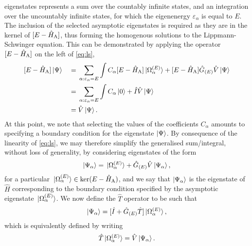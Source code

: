 \documentclass[]{article}
\begin{document}
eigenstates represents a sum over the countably infinite states, and an
integration over the uncountably infinite states, for which the eigenenergy
$\varepsilon_{\alpha}$ is equal to $E$.
The inclusion of the selected asymptotic eigenstates is required as they are in
the kernel of $[E - \hat{H}_{\rm{A}}]$, thus forming the homogenous
solutions to the Lippmann-Schwinger equation.
This can be demonstrated by applying the operator $[E - \hat{H}_{\rm{A}}]$
on the left of \eqref{eq:ls},
\begin{alignat*}{2}
  &
  [
    E
    -
    \hat{H}_{\rm{A}}
  ]
  \ket{\Psi}
  &
  {}={}
  &
  \sum_{\alpha : \varepsilon_{\alpha} = E}\int
  C_{\alpha}
  [
    E
    -
    \hat{H}_{\rm{A}}
  ]
  \ket*{\Omega_{\alpha}^{(E)}}
  +
  [
    E
    -
    \hat{H}_{\rm{A}}
  ]
  \hat{G}_{(E)}
  \hat{V}
  \ket{\Psi}
  \\
  &
  &
  {}={}
  &
  \sum_{\alpha : \varepsilon_{\alpha} = E}\int
  C_{\alpha}
  \ket{0}
  +
  \hat{I}
  \hat{V}
  \ket{\Psi}
  \\
  &
  &
  {}={}
  &
  \hat{V}
  \ket{\Psi}
  .
\end{alignat*}
At this point, we note that selecting the values of the coefficients
$C_{\alpha}$ amounts to specifying a boundary condition for the eigenstate
$\ket{\Psi}$.
By consequence of the linearity of \eqref{eq:ls}, we may therefore simplify
the generalised sum/integral, without loss of generality, by considering
eigenstates of the form
\begin{equation}
  \label{eq:ls-boundary}
  \ket{\Psi_{\alpha}}
  =
  \ket*{\Omega_{\alpha}^{(E)}}
  +
  \hat{G}_{(E)}
  \hat{V}
  \ket{\Psi_{\alpha}}
  ,
\end{equation}
for a particular
$\ket*{\Omega_{\alpha}^{(E)}} \in \ker(E - \hat{H}_{\rm{A}})$, and we say
that $\ket{\Psi_{\alpha}}$ is the eigenstate of $\hat{H}$ corresponding to the
boundary condition specified by the asymptotic eigenstate
$\ket*{\Omega_{\alpha}^{(E)}}$.
We now define the $\hat{T}$ operator to be such that
\begin{equation}
  \label{eq:t-operator}
  \ket{\Psi_{\alpha}}
  =
  [
    \hat{I}
    +
    \hat{G}_{(E)}
    \hat{T}
  ]
  \ket*{\Omega_{\alpha}^{(E)}}
  ,
\end{equation}
which is equivalently defined by writing
\begin{equation}
  \label{eq:t-operator-v}
  \hat{T}
  \ket*{\Omega_{\alpha}^{(E)}}
  =
  \hat{V}
  \ket{\Psi_{\alpha}}
  .
\end{equation}
\end{document}
